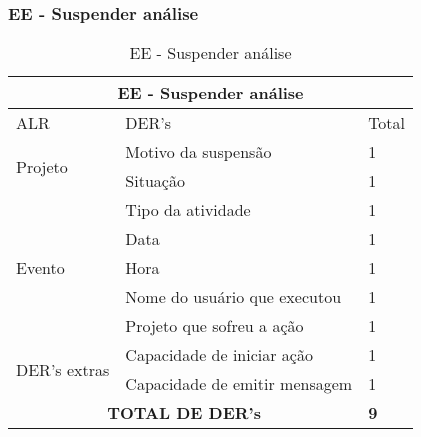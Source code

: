 \subsubsection{EE - Suspender análise}

\begin{table}[!h]
\centering
\caption{EE - Suspender análise}
\label{ee_suspender_analise}
\begin{tabular}{|l|l|l|}
\hline
\multicolumn{3}{|c|}{EE - Suspender análise}                          \\ \hline
ALR                           & DER's                         & Total \\ \hline
\multirow{2}{*}{Projeto}      & Motivo da suspensão           & 1     \\ \cline{2-3} 
                              & Situação                      & 1     \\ \hline
\multirow{5}{*}{Evento}       & Tipo da atividade             & 1     \\ \cline{2-3} 
                              & Data                          & 1     \\ \cline{2-3} 
                              & Hora                          & 1     \\ \cline{2-3} 
                              & Nome do usuário que executou  & 1     \\ \cline{2-3} 
                              & Projeto que sofreu a ação     & 1     \\ \hline
\multirow{2}{*}{DER's extras} & Capacidade de iniciar ação    & 1     \\ \cline{2-3} 
                              & Capacidade de emitir mensagem & 1     \\ \hline
\multicolumn{2}{|c|}{\textbf{TOTAL DE DER's}}                          & \textbf{9}     \\ \hline
\end{tabular}
\end{table}
 
 
\vfill
\pagebreak
